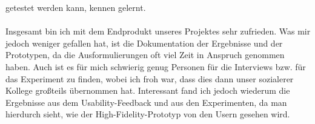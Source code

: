 \documentclass[a4paper,10pt]{scrartcl}
\begin{document}
getestet werden kann, kennen gelernt.
\\ \\
Insgesamt bin ich mit dem Endprodukt unseres Projektes sehr zufrieden. Was mir jedoch weniger gefallen hat, ist die Dokumentation der Ergebnisse und der Prototypen, da
die Ausformulierungen oft viel Zeit in Anspruch genommen haben. Auch ist es für mich schwierig genug Personen für die Interviews bzw. für das Experiment zu finden, wobei
ich froh war, dass dies dann unser sozialerer Kollege großteils übernommen hat. Interessant fand ich jedoch wiederum die Ergebnisse aus dem Usability-Feedback und aus den Experimenten,
da man hierdurch sieht, wie der High-Fidelity-Prototyp von den Usern gesehen wird.
\end{document}
